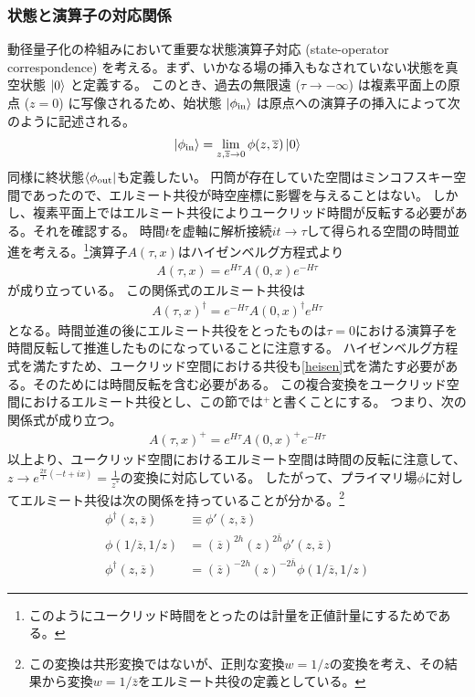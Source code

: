 \documentclass[11pt, dvipdfmx]{article}
\numberwithin{equation}{section}
\begin{document}
\subsubsection{状態と演算子の対応関係}
動径量子化の枠組みにおいて重要な状態演算子対応 (state-operator correspondence) を考える。まず、いかなる場の挿入もなされていない状態を真空状態 $\ket{0}$ と定義する。
このとき、過去の無限遠 ($\tau \to -\infty$) は複素平面上の原点 ($z=0$) に写像されるため、始状態 $\ket{\phi_{\text{in}}}$ は原点への演算子の挿入によって次のように記述される。
\begin{align}
    \ket{\phi_{\text{in}}}=\lim_{z,\overline{z}\rightarrow 0}\phi(z,\overline{z})\ket{0}
\end{align}
同様に終状態$\bra{\phi_{\text{out}}}$も定義したい。
円筒が存在していた空間はミンコフスキー空間であったので、エルミート共役が時空座標に影響を与えることはない。
しかし、複素平面上ではエルミート共役によりユークリッド時間が反転する必要がある。それを確認する。
時間$t$を虚軸に解析接続$it\rightarrow \tau$して得られる空間の時間並進を考える。\footnote{
    このようにユークリッド時間をとったのは計量を正値計量にするためである。
}演算子$A(\tau,x)$はハイゼンベルグ方程式より
\begin{align}
A(\tau,x)=e^{H\tau}A(0,x)e^{-H\tau}    \label{heisen}
\end{align}
が成り立っている。
この関係式のエルミート共役は
\begin{align}
    A(\tau ,x)^\dagger=e^{-H\tau}A(0,x)^\dagger e^{H\tau}
\end{align}
となる。時間並進の後にエルミート共役をとったものは$\tau=0$における演算子を時間反転して推進したものになっていることに注意する。
ハイゼンベルグ方程式を満たすため、ユークリッド空間における共役も\eqref{heisen}式を満たす必要がある。そのためには時間反転を含む必要がある。
この複合変換をユークリッド空間におけるエルミート共役とし、この節では$^+$と書くことにする。
つまり、次の関係式が成り立つ。
\begin{align}
    A(\tau,x)^+=e^{H\tau}A(0,x)^+e^{-H\tau}
\end{align}
以上より、ユークリッド空間におけるエルミート空間は時間の反転に注意して、  $z\rightarrow e^{\frac{2\pi}{l}(-t+ix)}=\frac{1}{z^*}$の変換に対応している。
したがって、プライマリ場$\phi$に対してエルミート共役は次の関係を持っていることが分かる。\footnote{
    この変換は共形変換ではないが、正則な変換$w=1/z$の変換を考え、その結果から変換$w=1/\bar{z}$をエルミート共役の定義としている。
}
\begin{align}
    \phi^\dagger(z,\overline{z})&\equiv\phi'(z,\bar{z})\\
    \phi(1/\overline{z},1/z)&=(\overline{z})^{2h}(z)^{2\bar{h}}\phi'(z,\overline{z})\\
     \phi^\dagger(z,\overline{z})&=(\overline{z})^{-2h}(z)^{-2\bar{h}} \phi(1/\overline{z},1/z)\label{hermite}
\end{align}
\end{document}
